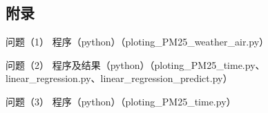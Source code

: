 \documentclass[12pt, a4paper, oneside]{ctexart}
\begin{document}
    \newpage

    \begin{appendices}
        \renewcommand{\thesection}{\Alph{section}}


        \section{附录}\label{sec:2}
        \par 问题（1） 程序（python）（ploting\_PM25\_weather\_air.py）
        \par 问题（2） 程序及结果（python）（ploting\_PM25\_time.py、linear\_regression.py、linear\_regression\_predict.py）
        \par 问题（3） 程序（python）（ploting\_PM25\_time.py）
    \end{appendices}
\end{document}
